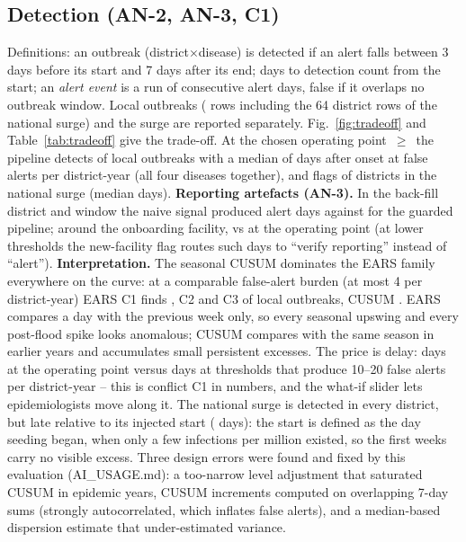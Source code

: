 \documentclass[conference]{IEEEtran}
\begin{document}
\subsection{Detection (AN-2, AN-3, C1)}\label{sec:evdet}
Definitions: an outbreak (district$\times$disease) is detected if an alert falls between 3 days before its
start and 7 days after its end; days to detection count from the start; an \emph{alert event} is a run of
consecutive alert days, false if it overlaps no outbreak window. Local outbreaks (\NOutbreakRows{} rows
including the 64 district rows of the national surge) and the surge are reported separately.
Fig.~\ref{fig:tradeoff} and Table~\ref{tab:tradeoff} give the trade-off. At the chosen operating point
\OpMethod{}\,$\geq$\,\OpThreshold{} the pipeline detects \SensLocal{} of local outbreaks with a median of
\MedDelayLocal{} days after onset at \FAperDY{} false alerts per district-year (all four diseases together),
and flags \SensNRS{} of districts in the national surge (median \MedDelayNRS{} days).
\textbf{Reporting artefacts (AN-3).} In the back-fill district and window the naive signal produced
\ArtBackfillNaive{} alert days against \ArtBackfillGuarded{} for the guarded pipeline; around the onboarding
facility, \ArtOnboardNaive{} vs \ArtOnboardGuarded{} at the operating point (at lower thresholds the new-facility
flag routes such days to ``verify reporting'' instead of ``alert'').
\textbf{Interpretation.} The seasonal CUSUM dominates the EARS family everywhere on the curve: at a comparable
false-alert burden (at most 4 per district-year) EARS C1 finds \EarsCOneSensLowFA{}, C2 \EarsCTwoSensLowFA{} and C3
\EarsCThreeSensLowFA{} of local outbreaks, CUSUM \CusumSensLowFA{}. EARS compares a day with the previous week only, so every seasonal upswing and every post-flood spike looks
anomalous; CUSUM compares with the same season in earlier years and accumulates small persistent excesses. The
price is delay: \MedDelayLocal{} days at the operating point versus \CusumDelayHighFA{} days at thresholds that produce
10--20 false alerts per district-year -- this is conflict C1 in numbers, and the what-if slider lets
epidemiologists move along it. The national surge is detected in every district, but late relative to its
injected start (\MedDelayNRS{} days): the start is defined as the day seeding began, when only a few infections
per million existed, so the first weeks carry no visible excess. Three design errors were found and fixed by
this evaluation (AI\_USAGE.md): a too-narrow level adjustment that saturated CUSUM in epidemic years, CUSUM
increments computed on overlapping 7-day sums (strongly autocorrelated, which inflates false alerts), and a
median-based dispersion estimate that under-estimated variance.
\end{document}

